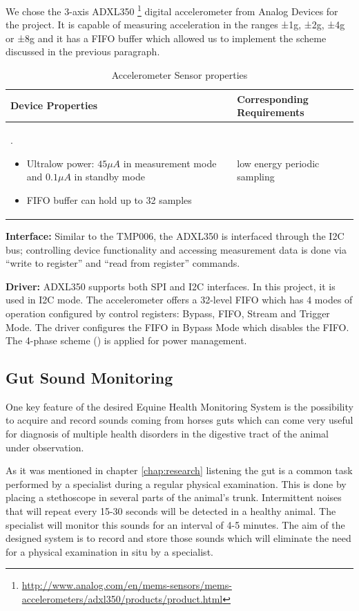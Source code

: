 We chose the 3-axis  ADXL350 \footnote{\url{http://www.analog.com/en/mems-sensors/mems-accelerometers/adxl350/products/product.html}} digital accelerometer from Analog Devices for the project. It is capable of measuring acceleration in the ranges ±1g, ±2g, ±4g or ±8g and it has a FIFO buffer which allowed us to implement the scheme discussed in the previous paragraph.

\begin{table}
\centering
\begin{tabular}{|m{}|m{}|}
\hline 
	\textbf{Device Properties} &
	\textbf{Corresponding Requirements}  \\ 
\hline
	.
	\begin{itemize}
	\item Ultralow power: $45 \mu A$ in measurement mode and $0.1 \mu A$ in standby mode
	\item FIFO buffer can hold up to 32 samples
	\end{itemize} &
	low energy periodic sampling  \\ 
\hline 
\end{tabular} 
\caption{Accelerometer Sensor properties}
\label{tab:accelerometer_properties}
\end{table}

\textbf{Interface:} Similar to the TMP006, the ADXL350 is interfaced through the I2C bus; controlling device functionality and accessing measurement data is done via “write to register” and “read from register” commands. 

\textbf{Driver:} ADXL350 supports both SPI and I2C interfaces. In this project, it is used in I2C mode. The accelerometer offers a 32-level FIFO which has 4 modes of operation configured by control registers: Bypass, FIFO, Stream and Trigger Mode. The driver configures the FIFO in Bypass Mode which disables the FIFO. The 4-phase scheme () is applied for power management. 


\subsection{Gut Sound Monitoring}
One key feature of the desired Equine Health Monitoring System is the possibility to acquire and record sounds coming from horses guts which can come very useful for diagnosis of multiple health disorders in the digestive tract of the animal under observation.

As it was mentioned in chapter \ref{chap:research} listening the gut is a common task performed by a specialist during a regular physical examination. This is done by placing a stethoscope in several parts of the animal’s trunk. Intermittent noises that will repeat every 15-30 seconds will be detected in a healthy animal. The specialist will monitor this sounds for an interval of 4-5 minutes. The aim of the designed system is to record and store those sounds which will eliminate the need for a physical examination in situ by a specialist.


